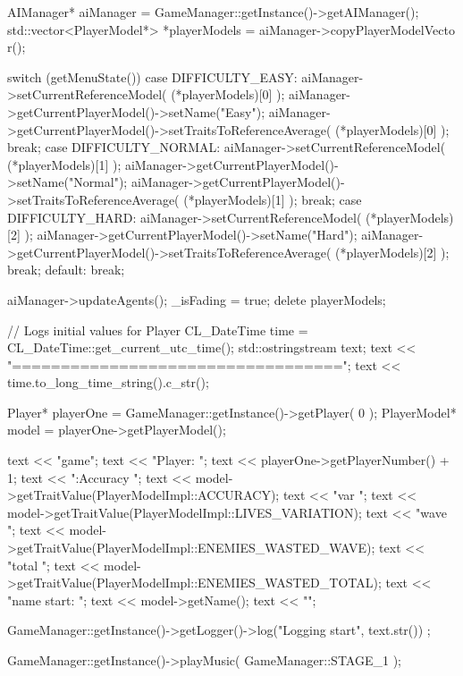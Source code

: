 \begin{DoxyCode}
{
        AIManager* aiManager = GameManager::getInstance()->getAIManager();
        std::vector<PlayerModel*> *playerModels = aiManager->copyPlayerModelVecto
      r();

        switch (getMenuState())
        {
        case DIFFICULTY_EASY:
                aiManager->setCurrentReferenceModel( (*playerModels)[0] );
                aiManager->getCurrentPlayerModel()->setName("Easy");
                aiManager->getCurrentPlayerModel()->setTraitsToReferenceAverage( 
      (*playerModels)[0] );
                break;
        case DIFFICULTY_NORMAL:
                aiManager->setCurrentReferenceModel( (*playerModels)[1] );
                aiManager->getCurrentPlayerModel()->setName("Normal");
                aiManager->getCurrentPlayerModel()->setTraitsToReferenceAverage( 
      (*playerModels)[1] );
                break;
        case DIFFICULTY_HARD:
                aiManager->setCurrentReferenceModel( (*playerModels)[2] );
                aiManager->getCurrentPlayerModel()->setName("Hard");
                aiManager->getCurrentPlayerModel()->setTraitsToReferenceAverage( 
      (*playerModels)[2] );
                break;
        default:
                break;
        }

        aiManager->updateAgents();
        _isFading = true;
        delete playerModels;

        // Logs initial values for Player
        CL_DateTime time = CL_DateTime::get_current_utc_time();
        std::ostringstream text;
        text << "\n==================================\n";
        text << time.to_long_time_string().c_str();

        Player* playerOne = GameManager::getInstance()->getPlayer( 0 );
        PlayerModel* model = playerOne->getPlayerModel();

        text << "\nStarting game\n\n ";
        text << "Player: ";
        text << playerOne->getPlayerNumber() + 1;
        text << "\nStats:\n Accuracy ";
        text << model->getTraitValue(PlayerModelImpl::ACCURACY);
        text << "\tLives var ";
        text << model->getTraitValue(PlayerModelImpl::LIVES_VARIATION);
        text << "\tEnemies wave ";
        text << model->getTraitValue(PlayerModelImpl::ENEMIES_WASTED_WAVE);
        text << "\tEnemies total ";
        text << model->getTraitValue(PlayerModelImpl::ENEMIES_WASTED_TOTAL);
        text << "\nModel name start: ";
        text << model->getName();
        text << "\n";

        GameManager::getInstance()->getLogger()->log("Logging start", text.str())
      ;

        GameManager::getInstance()->playMusic( GameManager::STAGE_1 );
}
\end{DoxyCode}


